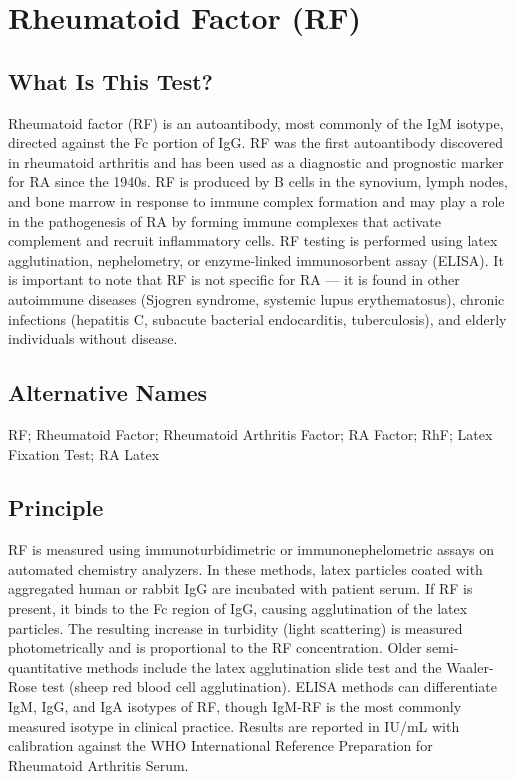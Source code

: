 \chapter{Rheumatoid Factor (RF)}

\section*{What Is This Test?}
Rheumatoid factor (RF) is an autoantibody, most commonly of the IgM isotype, directed against the Fc portion of IgG. RF was the first autoantibody discovered in rheumatoid arthritis and has been used as a diagnostic and prognostic marker for RA since the 1940s. RF is produced by B cells in the synovium, lymph nodes, and bone marrow in response to immune complex formation and may play a role in the pathogenesis of RA by forming immune complexes that activate complement and recruit inflammatory cells. RF testing is performed using latex agglutination, nephelometry, or enzyme-linked immunosorbent assay (ELISA). It is important to note that RF is not specific for RA --- it is found in other autoimmune diseases (Sjogren syndrome, systemic lupus erythematosus), chronic infections (hepatitis C, subacute bacterial endocarditis, tuberculosis), and elderly individuals without disease.

\section*{Alternative Names}
RF; Rheumatoid Factor; Rheumatoid Arthritis Factor; RA Factor; RhF; Latex Fixation Test; RA Latex

\section*{Principle}
RF is measured using immunoturbidimetric or immunonephelometric assays on automated chemistry analyzers. In these methods, latex particles coated with aggregated human or rabbit IgG are incubated with patient serum. If RF is present, it binds to the Fc region of IgG, causing agglutination of the latex particles. The resulting increase in turbidity (light scattering) is measured photometrically and is proportional to the RF concentration. Older semi-quantitative methods include the latex agglutination slide test and the Waaler-Rose test (sheep red blood cell agglutination). ELISA methods can differentiate IgM, IgG, and IgA isotypes of RF, though IgM-RF is the most commonly measured isotype in clinical practice. Results are reported in IU/mL with calibration against the WHO International Reference Preparation for Rheumatoid Arthritis Serum.

